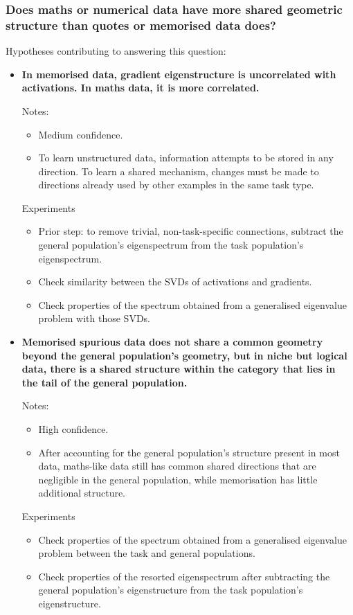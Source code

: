 \documentclass[11pt,a4paper]{article}
\newenvironment{notes}[1][Notes]{%
  \par\vspace{0.2em}#1:%
  \begin{itemize}%
}{%
  \end{itemize}%
}
\newenvironment{experiments}[1][Experiments]{%
  \par\vspace{0.2em}#1\par\vspace{0.1em}%
}{%
  \par%
}
\begin{document}
\subsubsection{Does maths or numerical data have more shared geometric structure than quotes or memorised data does?}

Hypotheses contributing to answering this question:

\begin{itemize}
  \item \textbf{In memorised data, gradient eigenstructure is uncorrelated with activations. In maths data, it is more correlated.}
    \begin{notes}
      \item  Medium confidence.
      \item To learn unstructured data, information attempts to be stored in any direction. To learn a shared mechanism, changes must be made to directions already used by other examples in the same task type.
    \end{notes}
    \begin{experiments}
    \begin{itemize}
      \item Prior step: to remove trivial, non-task-specific connections, subtract the general population's eigenspectrum from the task population's eigenspectrum.
      \item Check similarity between the SVDs of activations and gradients.
      \item Check properties of the spectrum obtained from a generalised eigenvalue problem with those SVDs.
    \end{itemize}
    \end{experiments}
  \item \textbf{Memorised spurious data does not share a common geometry beyond the general population's geometry, but in niche but logical data, there is a shared structure within the category that lies in the tail of the general population.}
    \begin{notes}
      \item High confidence.
      \item After accounting for the general population's structure present in most data, maths-like data still has common shared directions that are negligible in the general population, while memorisation has little additional structure.
    \end{notes}
    \begin{experiments}
    \begin{itemize}
      \item Check properties of the spectrum obtained from a generalised eigenvalue problem between the task and general populations.
      \item Check properties of the resorted eigenspectrum after subtracting the general population's eigenstructure from the task population's eigenstructure.
    \end{itemize}
    \end{experiments}
\end{itemize}
\end{document}
